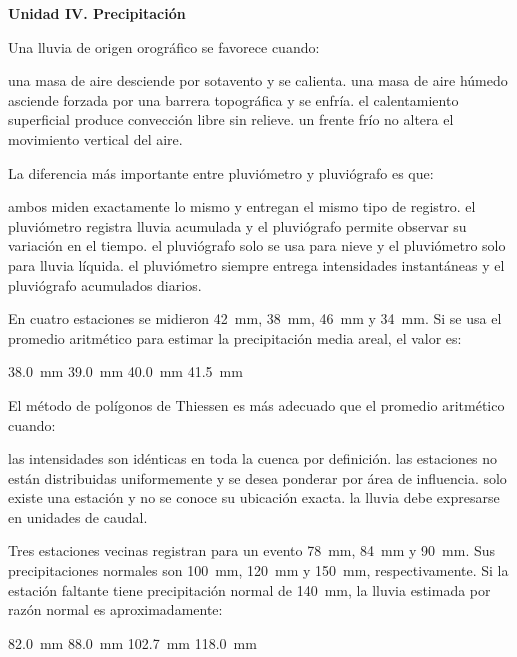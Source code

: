 \item[]\textbf{Unidad IV. Precipitación}\par\medskip

\question [5] Una lluvia de origen orográfico se favorece cuando:
\begin{choices}
\choice una masa de aire desciende por sotavento y se calienta.
\CorrectChoice una masa de aire húmedo asciende forzada por una barrera topográfica y se enfría.
\choice el calentamiento superficial produce convección libre sin relieve.
\choice un frente frío no altera el movimiento vertical del aire.
\end{choices}

\question [5] La diferencia más importante entre pluviómetro y pluviógrafo es que:
\begin{choices}
\choice ambos miden exactamente lo mismo y entregan el mismo tipo de registro.
\CorrectChoice el pluviómetro registra lluvia acumulada y el pluviógrafo permite observar su variación en el tiempo.
\choice el pluviógrafo solo se usa para nieve y el pluviómetro solo para lluvia líquida.
\choice el pluviómetro siempre entrega intensidades instantáneas y el pluviógrafo acumulados diarios.
\end{choices}

\question [5] En cuatro estaciones se midieron \SI{42}{mm}, \SI{38}{mm}, \SI{46}{mm} y \SI{34}{mm}. Si se usa el promedio aritmético para estimar la precipitación media areal, el valor es:
\begin{choices}
\choice \SI{38.0}{mm}
\choice \SI{39.0}{mm}
\CorrectChoice \SI{40.0}{mm}
\choice \SI{41.5}{mm}
\end{choices}

\question [5] El método de polígonos de Thiessen es más adecuado que el promedio aritmético cuando:
\begin{choices}
\choice las intensidades son idénticas en toda la cuenca por definición.
\CorrectChoice las estaciones no están distribuidas uniformemente y se desea ponderar por área de influencia.
\choice solo existe una estación y no se conoce su ubicación exacta.
\choice la lluvia debe expresarse en unidades de caudal.
\end{choices}

\question [5] Tres estaciones vecinas registran para un evento \SI{78}{mm}, \SI{84}{mm} y \SI{90}{mm}. Sus precipitaciones normales son \SI{100}{mm}, \SI{120}{mm} y \SI{150}{mm}, respectivamente. Si la estación faltante tiene precipitación normal de \SI{140}{mm}, la lluvia estimada por razón normal es aproximadamente:
\begin{choices}
\choice \SI{82.0}{mm}
\choice \SI{88.0}{mm}
\CorrectChoice \SI{102.7}{mm}
\choice \SI{118.0}{mm}
\end{choices}

